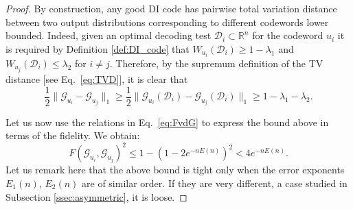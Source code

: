 \documentclass[10pt,conference]{IEEEtran}
\newcommand{\1}{\mathds{1}}
\newcommand{\RR}{\mathbb{R}}
\newcommand{\cD}{\mathcal{D}}
\newcommand{\cG}{\mathcal{G}}
\newcommand{\aw}[1]{{\color{blue}#1}}
\begin{document}

\begin{proof}
By construction, any good DI code has pairwise total variation distance between two output distributions corresponding to different codewords lower bounded. Indeed, given an optimal decoding test $\cD_i\subset\RR^n$ for the codeword $u_i$ it is required by Definition \ref{def:DI_code} that $W_{u_i}(\cD_i)\geq 1-\lambda_1$ and $W_{u_{j}}(\cD_i)\le \lambda_2$ for $i\neq j$. Therefore, by the supremum definition of the TV distance [see Eq.~\eqref{eq:TVD}], it is clear that 
\begin{equation*}
  \label{eq:converseTVD}
  \frac12\|\cG_{u_i}-\cG_{u_{j}}\|_1
   \geq \frac12\|\cG_{u_i}(\cD_i)-\cG_{u_{j}}(\cD_i)\|_1
  \geq 1-\lambda_1-\lambda_2.
\end{equation*}

Let us now use the relations in Eq.~\eqref{eq:FvdG} to express the bound above in terms of the fidelity. We obtain:
\begin{equation}
  \label{eq:maxFidelity}
  F(\cG_{u_i},\cG_{u_{j}})^2
    \leq 1-\left(1-2e^{-nE(n)}\right)^2 %
    < 4e^{-nE(n)}.
\end{equation}
Let us remark here that the above bound is tight only when the error exponents $E_1(n),\,E_2(n)$ are of similar order. If they are very different, a case studied in Subsection \ref{ssec:asymmetric}, it is loose. 


\end{proof}
\end{document}
